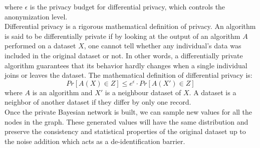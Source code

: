 where $\epsilon$ is the privacy budget for differential privacy, which controls the anonymization level. \\
Differential privacy is a rigorous mathematical definition of privacy. An algorithm is said to be differentially private if by looking at the output of an algorithm $A$ performed on a dataset $X$, one cannot tell whether any individual's data was included in the original dataset or not. In other words, a differentially private algorithm guarantees that its behavior hardly changes when a single individual joins or leaves the dataset.
The mathematical definition of differential privacy is:
\begin{equation*}
    Pr[A(X) \in Z] \leq e^{\epsilon} \cdot Pr[A(X') \in Z]
\end{equation*}
where $A$ is an algorithm and $X'$ is a neighbour dataset of $X$. A dataset is a neighbor of another dataset if they differ by only one record. \\ 
Once the private Bayesian network is built, we can sample new values for all the nodes in the graph. These generated values will have the same distribution and preserve the consistency and statistical properties of the original dataset up to the noise addition which acts as a de-identification barrier. 
